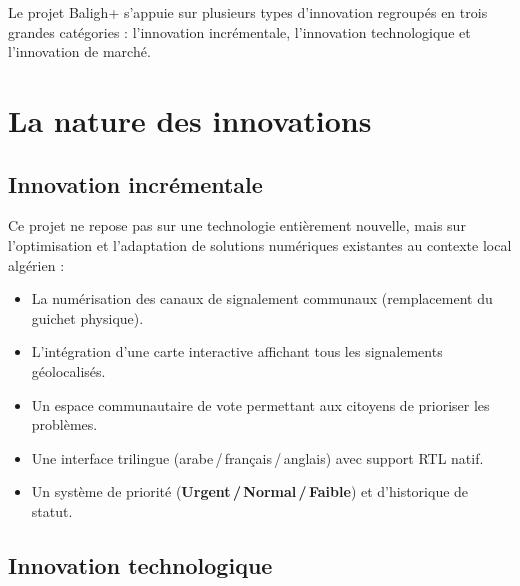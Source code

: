 \documentclass[12pt,a4paper]{report}
\begin{document}
Le projet Baligh+ s'appuie sur plusieurs types d'innovation regroupés en trois
grandes catégories : l'innovation incrémentale, l'innovation technologique et
l'innovation de marché.

\section{La nature des innovations}

\subsection{Innovation incrémentale}

Ce projet ne repose pas sur une technologie entièrement nouvelle, mais sur
l'optimisation et l'adaptation de solutions numériques existantes au contexte
local algérien :

\begin{itemize}
  \item La numérisation des canaux de signalement communaux (remplacement du
        guichet physique).
  \item L'intégration d'une carte interactive affichant tous les signalements
        géolocalisés.
  \item Un espace communautaire de vote permettant aux citoyens de prioriser
        les problèmes.
  \item Une interface trilingue (arabe\,/\,français\,/\,anglais) avec support
        RTL natif.
  \item Un système de priorité (\textbf{Urgent\,/\,Normal\,/\,Faible}) et
        d'historique de statut.
\end{itemize}

\subsection{Innovation technologique}
\end{document}
